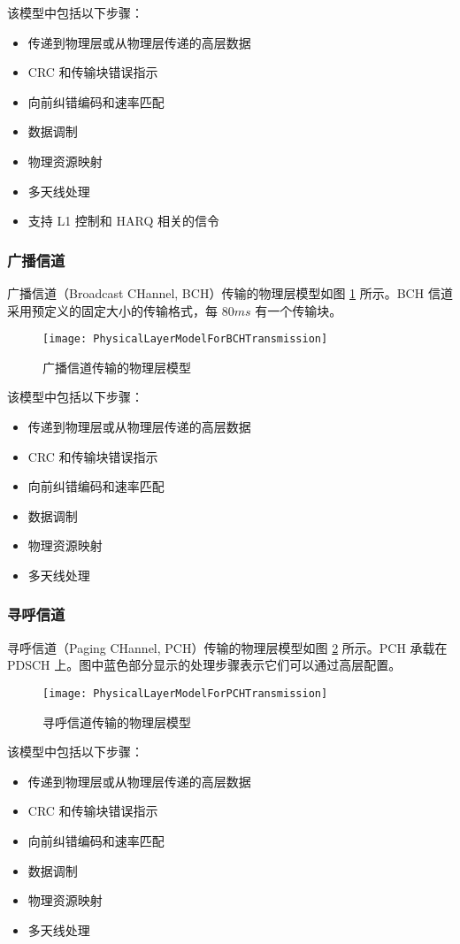 \documentclass[cn,hazy,blue,14pt,screen,device=normal]{elegantnote}
\begin{document}
该模型中包括以下步骤：
\begin{itemize}[leftmargin=2cm]
	\item 传递到物理层或从物理层传递的高层数据
	\item CRC 和传输块错误指示
	\item 向前纠错编码和速率匹配
	\item 数据调制
	\item 物理资源映射
	\item 多天线处理
	\item 支持 L1 控制和 HARQ 相关的信令
\end{itemize}

\subsubsection{广播信道}
广播信道（Broadcast CHannel, BCH）传输的物理层模型如图 \ref{PhysicalLayerModelForBCHTransmission} 所示。BCH 信道采用预定义的固定大小的传输格式，每 $80ms$ 有一个传输块。
\begin{figure}[!htbp]
	\centering
	\texttt{[image: PhysicalLayerModelForBCHTransmission]}
	\caption{广播信道传输的物理层模型}
	\label{PhysicalLayerModelForBCHTransmission}
\end{figure}

该模型中包括以下步骤：
\begin{itemize}[leftmargin=2cm]
	\item 传递到物理层或从物理层传递的高层数据
	\item CRC 和传输块错误指示
	\item 向前纠错编码和速率匹配
	\item 数据调制
	\item 物理资源映射
	\item 多天线处理
\end{itemize}

\subsubsection{寻呼信道}
寻呼信道（Paging CHannel, PCH）传输的物理层模型如图 \ref{PhysicalLayerModelForPCHTransmission} 所示。PCH 承载在 PDSCH 上。图中蓝色部分显示的处理步骤表示它们可以通过高层配置。
\begin{figure}[!htbp]
	\centering
	\texttt{[image: PhysicalLayerModelForPCHTransmission]}
	\caption{寻呼信道传输的物理层模型}
	\label{PhysicalLayerModelForPCHTransmission}
\end{figure}

该模型中包括以下步骤：
\begin{itemize}[leftmargin=2cm]
	\item 传递到物理层或从物理层传递的高层数据
	\item CRC 和传输块错误指示
	\item 向前纠错编码和速率匹配
	\item 数据调制
	\item 物理资源映射
	\item 多天线处理
\end{itemize}
\end{document}
